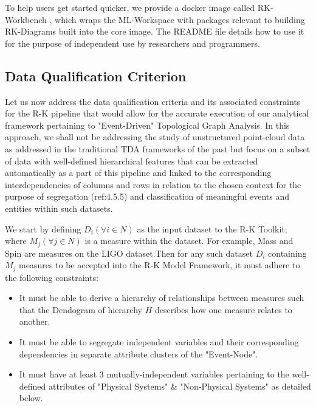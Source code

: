 To help users get started quicker, we provide a docker image called RK-Workbench \cite{andorsk_2021_andorskrkworkbench}, which wraps the ML-Workspace \cite{mltooling_2021_mltoolingmlworkspace} with packages relevant to building RK-Diagrams built into the core image. The README file details how to use it for the purpose of independent use by researchers and programmers. 

\subsection{Data Qualification Criterion}

Let us now address the data qualification criteria and its associated constraints for the R-K pipeline that would allow for the accurate execution of our analytical framework pertaining to "Event-Driven" Topological Graph Analysis. In this approach, we shall not be addressing the study of unstructured point-cloud data as addressed in the traditional TDA frameworks of the past \cite{01.9_2007MapperPBG} \cite{02_carlsson2009topology} \cite{02.3_2017introductionTDA} but focus on a subset of data with well-defined hierarchical features that can be extracted automatically as a part of this pipeline and linked to the corresponding interdependencies of columns and rows in relation to the chosen context for the purpose of segregation (ref:4.5.5) and classification of meaningful events and entities within such datasets.

We start by defining $D_i (\forall i \in N)$ as the input dataset to the R-K Toolkit; where $M_j (\forall j \in N)$ is a measure within the dataset. For example, Mass and Spin are measures on the LIGO dataset.\cite{00_LIGOOpenSciData}Then for any such dataset $D_i$ containing $M_j$ measures to be accepted into the R-K Model Framework, it must adhere to the following constraints:

\begin{itemize}
	\item It must be able to derive a hierarchy of relationships between measures such that the Dendogram of hierarchy $H$ describes how one measure relates to another.
	\item It must be able to segregate independent variables and their corresponding dependencies in separate attribute clusters of the "Event-Node".
	\item It must have at least 3 mutually-independent variables pertaining to the well-defined attributes of "Physical Systems" \&  "Non-Physical Systems" as detailed below.
\end{itemize}

